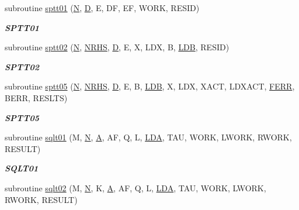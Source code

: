 \begin{DoxyCompactItemize}
subroutine \hyperlink{group__single__lin_gaf4f6def315de8e16096cdcfc52531a1a}{sptt01} (\hyperlink{polmisc_8c_a0240ac851181b84ac374872dc5434ee4}{N}, \hyperlink{odrpack_8h_a7dae6ea403d00f3687f24a874e67d139}{D}, E, D\+F, E\+F, W\+O\+R\+K, R\+E\+S\+I\+D)
\begin{DoxyCompactList}\small\item\em {\bfseries S\+P\+T\+T01} \end{DoxyCompactList}\item 
subroutine \hyperlink{group__single__lin_ga664c5c9bb09b31eee13720fd3defc774}{sptt02} (\hyperlink{polmisc_8c_a0240ac851181b84ac374872dc5434ee4}{N}, \hyperlink{example__user_8c_aa0138da002ce2a90360df2f521eb3198}{N\+R\+H\+S}, \hyperlink{odrpack_8h_a7dae6ea403d00f3687f24a874e67d139}{D}, E, X, L\+D\+X, B, \hyperlink{example__user_8c_a50e90a7104df172b5a89a06c47fcca04}{L\+D\+B}, R\+E\+S\+I\+D)
\begin{DoxyCompactList}\small\item\em {\bfseries S\+P\+T\+T02} \end{DoxyCompactList}\item 
subroutine \hyperlink{group__single__lin_ga52bbe67071295c8b879f12ea2f7dd02a}{sptt05} (\hyperlink{polmisc_8c_a0240ac851181b84ac374872dc5434ee4}{N}, \hyperlink{example__user_8c_aa0138da002ce2a90360df2f521eb3198}{N\+R\+H\+S}, \hyperlink{odrpack_8h_a7dae6ea403d00f3687f24a874e67d139}{D}, E, B, \hyperlink{example__user_8c_a50e90a7104df172b5a89a06c47fcca04}{L\+D\+B}, X, L\+D\+X, X\+A\+C\+T, L\+D\+X\+A\+C\+T, \hyperlink{superlu__enum__consts_8h_af00a42ecad444bbda75cde1b64bd7e72a78fd14d7abebae04095cfbe02928f153}{F\+E\+R\+R}, B\+E\+R\+R, R\+E\+S\+L\+T\+S)
\begin{DoxyCompactList}\small\item\em {\bfseries S\+P\+T\+T05} \end{DoxyCompactList}\item 
subroutine \hyperlink{group__single__lin_ga71a00e88763c10e57fe3e7998e9932b4}{sqlt01} (M, \hyperlink{polmisc_8c_a0240ac851181b84ac374872dc5434ee4}{N}, \hyperlink{classA}{A}, A\+F, Q, L, \hyperlink{example__user_8c_ae946da542ce0db94dced19b2ecefd1aa}{L\+D\+A}, T\+A\+U, W\+O\+R\+K, L\+W\+O\+R\+K, R\+W\+O\+R\+K, R\+E\+S\+U\+L\+T)
\begin{DoxyCompactList}\small\item\em {\bfseries S\+Q\+L\+T01} \end{DoxyCompactList}\item 
subroutine \hyperlink{group__single__lin_ga286574d6b615b1f595888958bbdf366e}{sqlt02} (M, \hyperlink{polmisc_8c_a0240ac851181b84ac374872dc5434ee4}{N}, K, \hyperlink{classA}{A}, A\+F, Q, L, \hyperlink{example__user_8c_ae946da542ce0db94dced19b2ecefd1aa}{L\+D\+A}, T\+A\+U, W\+O\+R\+K, L\+W\+O\+R\+K, R\+W\+O\+R\+K, R\+E\+S\+U\+L\+T)

\end{DoxyCompactItemize}
